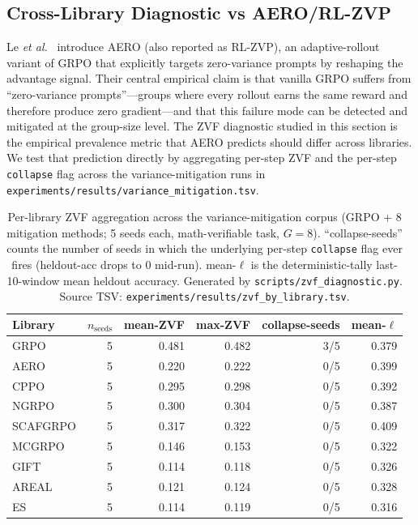 \documentclass{article}
\newcommand{\etal}{\emph{et al.}}
\begin{document}
\subsection{Cross-Library Diagnostic vs AERO/RL-ZVP}
\label{sec:zvf-cross-experiment:aero}

Le \etal~\cite{le2025rlzvp} introduce AERO (also reported as
RL-ZVP), an adaptive-rollout variant of GRPO that explicitly
targets zero-variance prompts by reshaping the advantage signal.
Their central empirical claim is that vanilla GRPO suffers from
``zero-variance prompts''---groups where every rollout earns the
same reward and therefore produce zero gradient---and that this
failure mode can be detected and mitigated at the group-size
level. The ZVF diagnostic studied in this section is the
empirical prevalence metric that AERO predicts should differ
across libraries. We test that prediction directly by aggregating
per-step ZVF and the per-step \texttt{collapse} flag across the
variance-mitigation runs in
\texttt{experiments/results/variance\_mitigation.tsv}.

\begin{table}[ht]
\centering
\small
\begin{tabular}{lrrrrr}
\toprule
Library & $n_{\text{seeds}}$ & mean-ZVF & max-ZVF & collapse-seeds & mean-$\ell$ \\
\midrule
GRPO      & 5 & 0.481 & 0.482 & 3/5 & 0.379 \\
AERO      & 5 & 0.220 & 0.222 & 0/5 & 0.399 \\
CPPO      & 5 & 0.295 & 0.298 & 0/5 & 0.392 \\
NGRPO     & 5 & 0.300 & 0.304 & 0/5 & 0.387 \\
SCAFGRPO  & 5 & 0.317 & 0.322 & 0/5 & 0.409 \\
MCGRPO    & 5 & 0.146 & 0.153 & 0/5 & 0.322 \\
GIFT      & 5 & 0.114 & 0.118 & 0/5 & 0.326 \\
AREAL     & 5 & 0.121 & 0.124 & 0/5 & 0.328 \\
ES        & 5 & 0.114 & 0.119 & 0/5 & 0.316 \\
\bottomrule
\end{tabular}
\caption{Per-library ZVF aggregation across the variance-mitigation
corpus (GRPO + 8 mitigation methods; 5 seeds each, math-verifiable
task, $G{=}8$). ``collapse-seeds'' counts the number of seeds in
which the underlying per-step \texttt{collapse} flag ever fires
(heldout-acc drops to 0 mid-run). mean-$\ell$ is the
deterministic-tally last-10-window mean heldout accuracy. Generated
by \texttt{scripts/zvf\_diagnostic.py}. Source TSV:
\texttt{experiments/results/zvf\_by\_library.tsv}.}
\label{tab:zvf-by-library-diagnostic}
\end{table}
\end{document}
